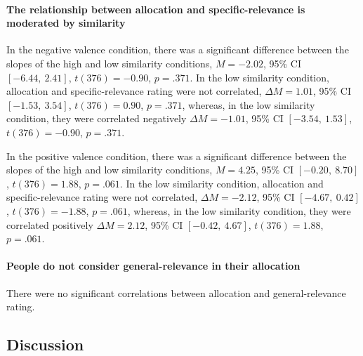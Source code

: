 \documentclass[a4paper, nobind, dvipsnames]{templates/ociamthesis}
\newcommand*{\bibtitle}{References}
\theoremstyle{definition}
\theoremstyle{definition}
\theoremstyle{definition}
\theoremstyle{definition}
\theoremstyle{remark}
\begin{document}
\hypertarget{the-relationship-between-allocation-and-specific-relevance-is-moderated-by-similarity}{%
\paragraph{The relationship between allocation and specific-relevance is moderated by similarity}\label{the-relationship-between-allocation-and-specific-relevance-is-moderated-by-similarity}}

In the negative valence condition, there was a significant difference between
the slopes of the high and low similarity conditions,
\(M = -2.02\), 95\% CI \([-6.44,~2.41]\), \(t(376) = -0.90\), \(p = .371\).
In the low similarity condition, allocation and specific-relevance rating were
not correlated,
\(\Delta M = 1.01\), 95\% CI \([-1.53,~3.54]\), \(t(376) = 0.90\), \(p = .371\),
whereas, in the low similarity condition, they were correlated negatively
\(\Delta M = -1.01\), 95\% CI \([-3.54,~1.53]\), \(t(376) = -0.90\), \(p = .371\).

In the positive valence condition, there was a significant difference between
the slopes of the high and low similarity conditions,
\(M = 4.25\), 95\% CI \([-0.20,~8.70]\), \(t(376) = 1.88\), \(p = .061\).
In the low similarity condition, allocation and specific-relevance rating were
not correlated,
\(\Delta M = -2.12\), 95\% CI \([-4.67,~0.42]\), \(t(376) = -1.88\), \(p = .061\),
whereas, in the low similarity condition, they were correlated positively
\(\Delta M = 2.12\), 95\% CI \([-0.42,~4.67]\), \(t(376) = 1.88\), \(p = .061\).

\hypertarget{people-do-not-consider-general-relevance-in-their-allocation}{%
\paragraph{People do not consider general-relevance in their allocation}\label{people-do-not-consider-general-relevance-in-their-allocation}}

There were no significant correlations between allocation and general-relevance
rating.

\hypertarget{discussion-17}{%
\subsection{Discussion}\label{discussion-17}}




\setlength{\baselineskip}{0pt} %

{\renewcommand*\MakeUppercase[1]{#1}%
\printbibliography[heading=bibintoc,title={\bibtitle}]}
\end{document}
